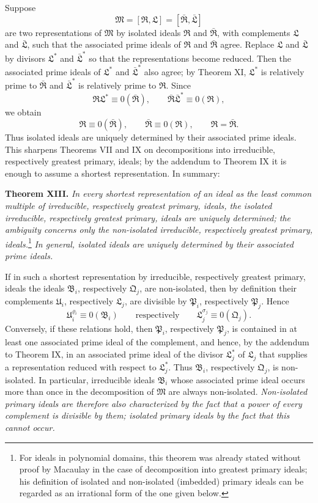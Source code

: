 \documentclass[11pt]{article}
\providecommand{\ideal}[1]{\mathfrak{#1}}
\begin{document}
Suppose
\[
 \ideal M=[\ideal R,
\ideal L]=[\bar{\ideal R},
\bar{\ideal L}]
\]
are two representations of $\ideal M$ by isolated ideals $\ideal R$ and $\bar{\ideal R}$, with complements $\ideal L$ and $\bar{\ideal L}$, such that the associated prime ideals of $\ideal R$ and $\bar{\ideal R}$ agree. Replace $\ideal L$ and $\bar{\ideal L}$ by divisors $\ideal L^*$ and $\bar{\ideal L}^{*}$ so that the representations become reduced. Then the associated prime ideals of $\ideal L^*$ and $\bar{\ideal L}^{*}$ also agree; by Theorem XI, $\ideal L^*$ is relatively prime to $\bar{\ideal R}$ and $\bar{\ideal L}^{*}$ is relatively prime to $\ideal R$. Since
\[
 \ideal R\ideal L^*\equiv0(\bar{\ideal R}),
 \qquad
 \bar{\ideal R}\bar{\ideal L}^{*}\equiv0(\ideal R),
\]
we obtain
\[
 \ideal R\equiv0(\bar{\ideal R}),
 \qquad
 \bar{\ideal R}\equiv0(\ideal R),
 \qquad
 \ideal R=\bar{\ideal R}.
\]
Thus isolated ideals are uniquely determined by their associated prime ideals. This sharpens Theorems VII and IX on decompositions into irreducible, respectively greatest primary, ideals; by the addendum to Theorem IX it is enough to assume a shortest representation. In summary:

\textbf{Theorem XIII.} \emph{In every shortest representation of an ideal as the least common multiple of irreducible, respectively greatest primary, ideals, the isolated irreducible, respectively greatest primary, ideals are uniquely determined; the ambiguity concerns only the non-isolated irreducible, respectively greatest primary, ideals.}\footnote{For ideals in polynomial domains, this theorem was already stated without proof by Macaulay in the case of decomposition into greatest primary ideals; his definition of isolated and non-isolated (imbedded) primary ideals can be regarded as an irrational form of the one given below.} \emph{In general, isolated ideals are uniquely determined by their associated prime ideals.}

If in such a shortest representation by irreducible, respectively greatest primary, ideals the ideals $\ideal B_i$, respectively $\ideal Q_j$, are non-isolated, then by definition their complements $\ideal U_i$, respectively $\ideal L_j$, are divisible by $\ideal P_i$, respectively $\ideal P_j$. Hence
\[
 \ideal U_i^{\varrho_i}\equiv0(\ideal B_i)
 \qquad \text{respectively} \qquad
 \ideal L_j^{\sigma_j}\equiv0(\ideal Q_j).
\]
Conversely, if these relations hold, then $\ideal P_i$, respectively $\ideal P_j$, is contained in at least one associated prime ideal of the complement, and hence, by the addendum to Theorem IX, in an associated prime ideal of the divisor $\ideal L_j^*$ of $\ideal L_j$ that supplies a representation reduced with respect to $\ideal L_j^*$. Thus $\ideal B_i$, respectively $\ideal Q_j$, is non-isolated. In particular, irreducible ideals $\ideal B_i$ whose associated prime ideal occurs more than once in the decomposition of $\ideal M$ are always non-isolated. \emph{Non-isolated primary ideals are therefore also characterized by the fact that a power of every complement is divisible by them; isolated primary ideals by the fact that this cannot occur.}
\end{document}
